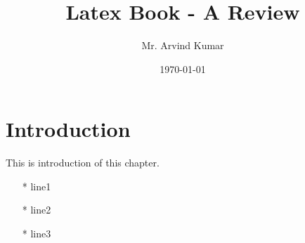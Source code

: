 \documentclass[a4paper,12pt]{book}
\begin{document}
	\title{Latex Book - A Review}
	\author{Mr. Arvind Kumar}
	\date{\today}
	\maketitle
	\tableofcontents
	\newpage
	\chapter{Introduction}
	This is introduction of this chapter.
	\begin{enumerate}
		\item[*] line1
		\item[*] line2
		\item[*] line3
	\end{enumerate}
\end{document}

